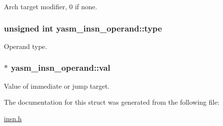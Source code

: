 Arch target modifier, 0 if none. \hypertarget{structyasm__insn__operand_ae12aee95f5ee1e89d39a38ef84f6a638}{
\subsubsection[{type}]{\setlength{\rightskip}{0pt plus 5cm}unsigned int yasm\-\_\-insn\-\_\-operand\-::type}}\label{structyasm__insn__operand_ae12aee95f5ee1e89d39a38ef84f6a638}
Operand type. \hypertarget{structyasm__insn__operand_af9d95be1e0d44cd63c9f2f9eb7eb4096}{
\subsubsection[{val}]{$\ast$ yasm\-\_\-insn\-\_\-operand\-::val}}\label{structyasm__insn__operand_af9d95be1e0d44cd63c9f2f9eb7eb4096}
Value of immediate or jump target. 

The documentation for this struct was generated from the following file\-:\begin{DoxyCompactItemize}
\item 
\hyperlink{insn_8h}{insn.\-h}\end{DoxyCompactItemize}
